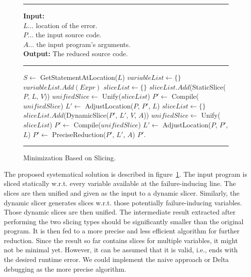 \begin{figure}[h]
	\hrule height.8pt depth0pt \kern2pt
	\textbf{Input:} \\
	\hspace*{\algorithmicindent} $L \ldots$ location of the error. \\
	\hspace*{\algorithmicindent} $P \ldots$ the input source code. \\
	\hspace*{\algorithmicindent} $A \ldots$ the input program's arguments. \\
	\textbf{Output:} The reduced source code. 
	\hrule height.8pt depth0pt \kern2pt
	\begin{algorithmic}[1]
		\State $S \leftarrow$ GetStatementAtLocation($L$)
		\State $variableList \leftarrow \{\}$
				\State $variableList.Add(Expr)$
			\EndIf
		\EndFor
		\State $sliceList \leftarrow \{\}$
			\State $sliceList.Add$(StaticSlice($P$, $L$, $V$))
		\EndFor
		\State $unifiedSlice \leftarrow$ Unify($sliceList$)
		\State $P' \leftarrow$ Compile($unifiedSlice$)
		\State $L' \leftarrow$ AdjustLocation($P$, $P'$, $L$)
		\State $sliceList \leftarrow \{\}$
			\State $sliceList.Add$(DynamicSlice($P'$, $L'$, $V$, $A$))
		\EndFor
		\State $unifiedSlice \leftarrow$ Unify($sliceList$)
		\State $P' \leftarrow$ Compile($unifiedSlice$)
		\State $L' \leftarrow$ AdjustLocation($P$, $P'$, $L$)
		\State $P' \leftarrow$ PreciseReduction($P'$, $L'$, $A$)
		\State \Return $P'$.
	\end{algorithmic} 
	\hrule height.8pt depth0pt \kern2pt
	\caption{Minimization Based on Slicing.} 
	\label{alg:slicing}
\end{figure}

The proposed systematical solution is described in figure~\ref{alg:slicing}.
The input program is sliced statically w.r.t.
every variable available at the failure-inducing line.
The slices are then unified and given as the input to a dynamic slicer.
Similarly, the dynamic slicer generates slices w.r.t.
those potentially failure-inducing variables.
Those dynamic slices are then unified.
The intermediate result extracted after performing the two slicing types 
should be significantly smaller than the original program.
It is then fed to a more precise and less efficient algorithm for further 
reduction.
Since the result so far contains slices for multiple variables, it might not 
be minimal yet.
However, it can be assumed that it is valid, i.e., ends with the desired 
runtime error.
We could implement the naive approach or Delta debugging as the more 
precise algorithm.

